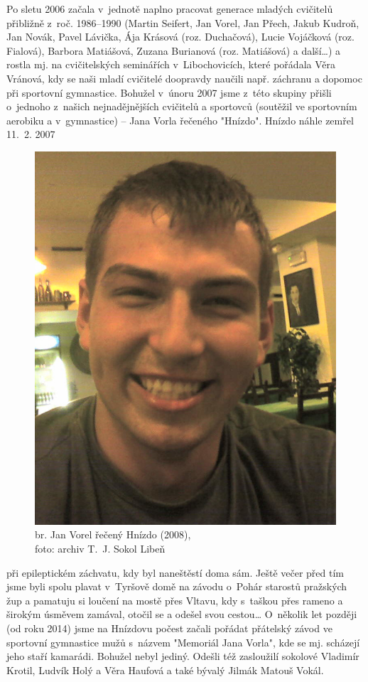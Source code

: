 \documentclass[a5paper, 11pt, twoside]{article}
\begin{document}
Po sletu 2006 začala v~jednotě naplno pracovat generace mladých
cvičitelů přibližně z~roč. 1986--1990 (Martin Seifert, Jan Vorel, Jan
Přech, Jakub Kudroň, Jan Novák, Pavel Lávička, Ája Krásová (roz.
Duchačová), Lucie Vojáčková (roz. Fialová), Barbora Matiášová, Zuzana Burianová (roz. Matiášová) a
další\ldots) a rostla mj. na cvičitelských seminářích v~Libochovicích,
které pořádala Věra Vránová, kdy se naši mladí cvičitelé doopravdy
naučili např. záchranu a dopomoc při sportovní gymnastice. Bohužel
v~únoru 2007 jsme z~této skupiny přišli o~jednoho z~našich nejnadějnějších
cvičitelů a sportovců (soutěžil ve sportovním aerobiku a v~gymnastice)
-- Jana Vorla řečeného "Hnízdo". Hnízdo náhle zemřel 11.~2. 2007
\begin{figure}
  \includegraphics[width=0.9\linewidth]{img/57_hnizdo.jpg}
  \caption*{br. Jan Vorel řečený Hnízdo (2008),\\foto: archiv T.~J. Sokol
  Libeň}
\end{figure}
při epileptickém záchvatu, kdy byl naneštěstí doma sám. Ještě večer před tím
jsme byli spolu plavat v~Tyršově domě na závodu o~Pohár starostů
pražských žup a pamatuju si loučení na mostě přes Vltavu, kdy s~taškou
přes rameno a širokým úsměvem zamával, otočil se a odešel svou
cestou\ldots{} O~několik let později (od roku 2014) jsme na Hnízdovu
počest začali pořádat přátelský závod ve sportovní gymnastice mužů
s~názvem "Memoriál Jana Vorla", kde se mj. scházejí jeho staří kamarádi.
Bohužel nebyl jediný. Odešli též zasloužilí sokolové Vladimír Krotil,
Ludvík Holý a Věra Haufová a také bývalý Jilmák Matouš Vokál.
\end{document}
